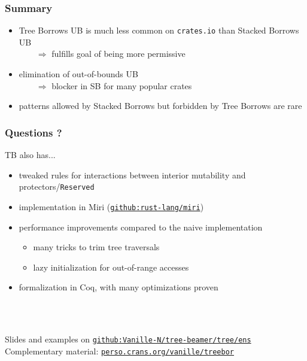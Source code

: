 \begin{frame}
    \frametitle{Summary}
    \begin{itemize}
        \item Tree Borrows UB is much less common on \texttt{crates.io} than Stacked Borrows UB\\
            \(\qquad\Rightarrow\) fulfills goal of being more permissive
        \item elimination of out-of-bounds UB\\
            \(\qquad\Rightarrow\) blocker in SB for many popular crates
        \item patterns allowed by Stacked Borrows but forbidden by Tree Borrows are rare
    \end{itemize}
\end{frame}

\begin{frame}
    \frametitle{Questions ?}

    TB also has...
    \begin{itemize}
        \item tweaked rules for interactions between interior mutability and protectors/\texttt{Reserved}
        \item implementation in Miri (\href{https://github.com/rust-lang/miri}{\texttt{github:rust-lang/miri}})
        \item performance improvements compared to the naive implementation
            \begin{itemize}
                \item many tricks to trim tree traversals
                \item lazy initialization for out-of-range accesses
            \end{itemize}
        \item formalization in Coq, with many optimizations proven
    \end{itemize}~\\~\\
    \vfill

    Slides and examples on \href{https://github.com/Vanille-N/tree-beamer/tree/ens}{\texttt{github:Vanille-N/tree-beamer/tree/ens}}\\
    Complementary material: \href{https://perso.crans.org/vanille/treebor}{\texttt{perso.crans.org/vanille/treebor}}\\
\end{frame}

\appendix

